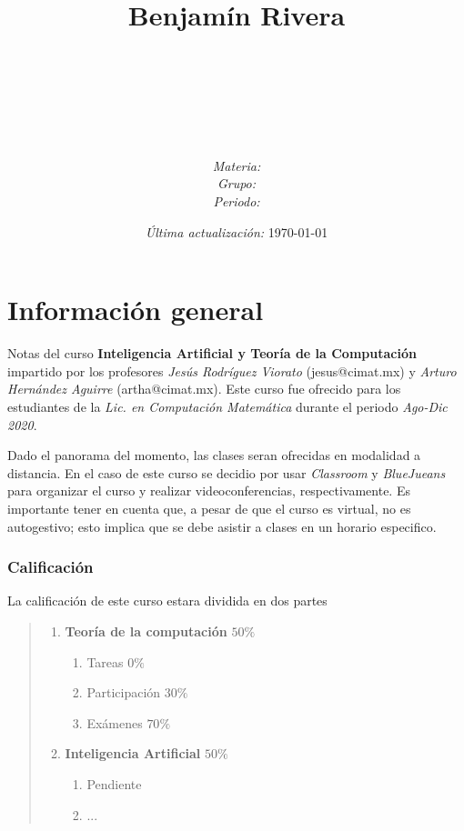 \documentclass[12pt]{book}
\title{
	\ \\ Benjam\'in Rivera \\
	\bf{\titulo}\\\ \\}
\author{
	\universidad \\
	\textit{\curso} \\
	\textit{Materia:} \materia \\
	\textit{Grupo:} \grupo \\
	\textit{Periodo:} \periodo }
\date{\textit{\'Ultima actualizaci\'on:} \today}
\newcommand{\materia}[0]{Inteligencia Artificial y Teor\'ia de la Computaci\'on}
\newcommand{\periodo}[0]{Ago-Dic 2020}
\newcommand{\curso}[0]{Lic. en Computaci\'on Matem\'atica}
\begin{document}
\maketitle

\section*{Informaci\'on general}

\par Notas del curso \textbf{\materia} impartido por los profesores \textit{Jes\'us Rodr\'iguez Viorato} (jesus@cimat.mx) y \textit{Arturo Hern\'andez Aguirre} (artha@cimat.mx). Este curso fue ofrecido para los estudiantes de la \textit{\curso} durante el periodo \textit{\periodo}.

\par Dado el panorama del momento, las clases seran ofrecidas en modalidad a distancia. En el caso de este curso se decidio por usar \textit{Classroom} y \textit{BlueJueans} para organizar el curso y realizar videoconferencias, respectivamente. Es importante tener en cuenta que, a pesar de que el curso es virtual, no es autogestivo; esto implica que se debe asistir a clases en un horario especifico.

\subsubsection*{Calificaci\'on}

\par La calificaci\'on de este curso estara dividida en dos partes
	\begin{quote} \begin{enumerate}[I]
		\item \textbf{Teor\'ia de la computaci\'on} $50\%$
			\begin{enumerate}
				\item Tareas $0\%$
				\item Participaci\'on $30\%$
				\item Ex\'amenes $70\%$
			\end{enumerate}		
		\item \textbf{Inteligencia Artificial} $50\%$
			\begin{enumerate}
				\item Pendiente
				\item ...
			\end{enumerate}
	\end{enumerate} \end{quote}
\end{document}
